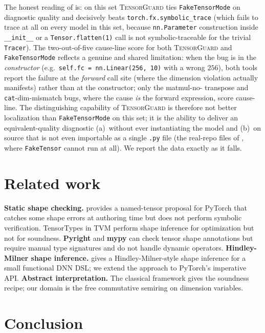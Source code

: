 \documentclass{article}
\theoremstyle{definition}
\begin{document}
The honest reading of  is: on this set
\textsc{TensorGuard} ties \verb|FakeTensorMode| on diagnostic
quality and decisively beats \verb|torch.fx.symbolic_trace|
(which fails to trace at all on every model in this set, because
\verb|nn.Parameter| construction inside \verb|__init__| or a
\verb|Tensor.flatten(1)| call is not symbolic-traceable for the
trivial \verb|Tracer|). The two-out-of-five cause-line score for
both \textsc{TensorGuard} and \verb|FakeTensorMode| reflects a
genuine and shared limitation: when the bug is in the
\emph{constructor} (e.g.\ \verb|self.fc = nn.Linear(256, 10)|
with a wrong $256$), both tools report the failure at the
\emph{forward} call site (where the dimension violation actually
manifests) rather than at the constructor; only the matmul-no-
transpose and \verb|cat|-dim-mismatch bugs, where the cause
\emph{is} the forward expression, score cause-line. The
distinguishing capability of \textsc{TensorGuard} is therefore not
better localization than \verb|FakeTensorMode| on this set; it is
the ability to deliver an equivalent-quality diagnostic
(a)~without ever instantiating the model and
(b)~on source that is not even importable as a single \verb|.py|
file (the real-repo files of , where
\verb|FakeTensor| cannot run at all). We report the data exactly
as it falls.

\section{Related work}\label{sec:related}

\textbf{Static shape checking.} \citet{rush2019tensor} provides a
named-tensor proposal for PyTorch that catches some shape errors at
authoring time but does not perform symbolic verification.
TensorTypes \citep{chen2018tvm} in TVM perform shape inference for
optimization but not for soundness. \textbf{Pyright} and
\textbf{mypy} can check tensor shape annotations but require manual
type signatures and do not handle dynamic operators.
\textbf{Hindley-Milner shape inference.} \citet{rink2018hindley}
gives a Hindley-Milner-style shape inference for a small functional
DNN DSL; we extend the approach to PyTorch's imperative API.
\textbf{Abstract interpretation.} The classical framework
\citep{cousot1977abstract} gives the soundness recipe; our domain is
the free commutative semiring on dimension variables.

\section{Conclusion}\label{sec:conclusion}
\end{document}

